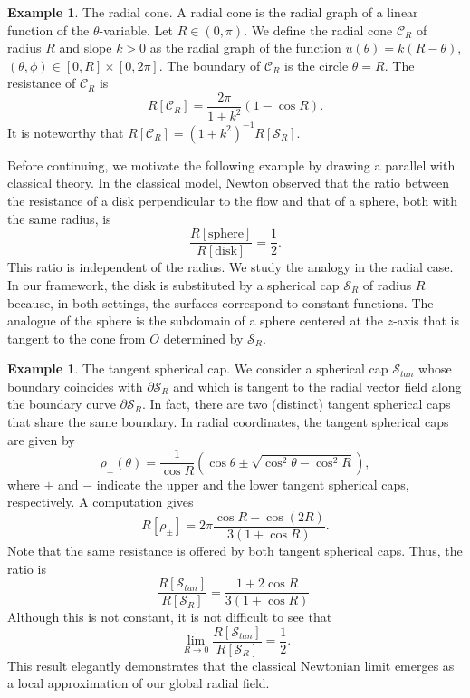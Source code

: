 \documentclass[a4paper,12pt]{amsart}
\theoremstyle{plain}
\theoremstyle{definition}
\newtheorem{example}[theorem]{Example}
\def\S{\mathcal S}
\begin{document}
\begin{example}\label{ex24}
 The radial cone. A radial cone is the radial graph of a linear function of the $\theta$-variable. Let $R\in (0,\pi)$. We define the radial cone $\mathcal{C}_R$ of radius $R$ and slope $k>0$ as the radial graph of the function $u(\theta) = k(R - \theta)$, $(\theta,\phi)\in [0,R]\times [0,2\pi]$. The boundary of $\mathcal{C}_R$ is the circle $\theta=R$. The resistance of $\mathcal{C}_R$ is 
\begin{equation}\label{r3}
 R[\mathcal{C}_R]  =\frac{2\pi}{1+k^2} (1 - \cos R).
\end{equation}
 It is noteworthy that $R[\mathcal{C}_R] = (1+k^2)^{-1} R[\S_R]$. 
\end{example}

Before   continuing, we motivate the following example by drawing a parallel with classical theory. In the classical model, Newton observed that the ratio  between the resistance of a disk perpendicular to the flow and that of a sphere, both with the same radius, is
$$\frac{R[\textrm{sphere}]}{R[\textrm{disk}]}=\frac12.$$
This ratio is independent of the radius. We study the analogy in the radial case. In our framework, the disk is substituted by a spherical cap $\S_R$ of radius $R$ because, in both settings, the surfaces correspond to constant functions. The analogue of the sphere is the subdomain of a sphere centered at the $z$-axis that is tangent to the cone from $O$ determined by $\S_R$.

\begin{example} 
The tangent spherical cap. We consider a spherical cap $\S_{tan}$ whose boundary coincides with $\partial \S_R$ and which is tangent to the radial vector field along the boundary curve $\partial \S_R$. In fact, there are two (distinct) tangent spherical caps that share the same boundary. In radial coordinates, the tangent spherical caps are given by 
$$\rho_{\pm}(\theta)=\frac{1}{\cos R}\left(\cos\theta \pm\sqrt{\cos^2\theta-\cos^2 R}\right),$$
where $+$ and $-$ indicate the upper and the lower tangent spherical caps, respectively. 
A computation gives 
$$R[\rho_{\pm}]=2\pi\frac{\cos R-\cos(2R)}{3(1+\cos R)}.$$
Note that the same resistance is offered by both tangent spherical caps.
Thus, the ratio is 
$$\frac{R[\S_{tan}]}{R[\S_R]}=\frac{1+2\cos R}{3(1+\cos R)}.$$
Although this is not constant, it is not difficult to see that 
$$\lim_{R\to 0}\frac{R[\S_{tan}]}{R[\S_R]}=\frac12.$$
This result elegantly demonstrates that the classical Newtonian limit emerges as a local approximation of our global radial field. 
\end{example}
\end{document}
